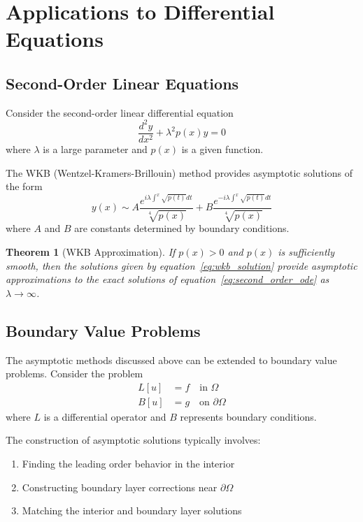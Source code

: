 \documentclass[11pt]{article}
\newtheorem{theorem}{Theorem}[section]
\begin{document}
\section{Applications to Differential Equations}\label{sec:applications}

\subsection{Second-Order Linear Equations}\label{subsec:second_order}

Consider the second-order linear differential equation
\begin{equation}\label{eq:second_order_ode}
\frac{d^2y}{dx^2} + \lambda^2 p(x) y = 0
\end{equation}
where $\lambda$ is a large parameter and $p(x)$ is a given function.

The WKB (Wentzel-Kramers-Brillouin) method provides asymptotic solutions of the form
\begin{equation}\label{eq:wkb_solution}
y(x) \sim A \frac{e^{i\lambda \int^x \sqrt{p(t)} dt}}{\sqrt[4]{p(x)}} + B \frac{e^{-i\lambda \int^x \sqrt{p(t)} dt}}{\sqrt[4]{p(x)}}
\end{equation}
where $A$ and $B$ are constants determined by boundary conditions.

\begin{theorem}[WKB Approximation]\label{thm:wkb}
If $p(x) > 0$ and $p(x)$ is sufficiently smooth, then the solutions given by equation~\eqref{eq:wkb_solution} provide asymptotic approximations to the exact solutions of equation~\eqref{eq:second_order_ode} as $\lambda \to \infty$.
\end{theorem}

\subsection{Boundary Value Problems}\label{subsec:boundary_value}

The asymptotic methods discussed above can be extended to boundary value problems. Consider the problem
\begin{align}
L[u] &= f \quad \text{in } \Omega \label{eq:boundary_problem_pde}\\
B[u] &= g \quad \text{on } \partial\Omega \label{eq:boundary_problem_bc}
\end{align}
where $L$ is a differential operator and $B$ represents boundary conditions.

The construction of asymptotic solutions typically involves:
\begin{enumerate}[label=(\roman*)]
\item Finding the leading order behavior in the interior
\item Constructing boundary layer corrections near $\partial\Omega$
\item Matching the interior and boundary layer solutions
\end{enumerate}
\end{document}
